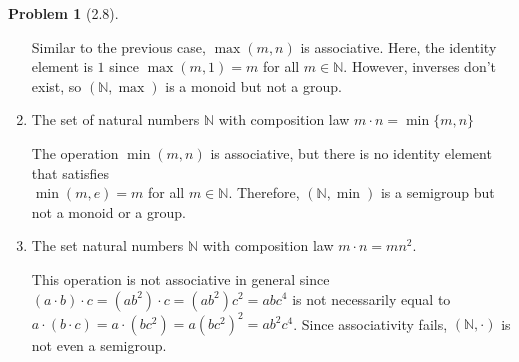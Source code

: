 \documentclass[12pt]{article}
\theoremstyle{definition}
\newtheorem{problem}{Problem}
\begin{document}
\begin{problem}[2.8]
\begin{enumerate}[label=(\alph*)]
        \begin{solution}
            Similar to the previous case, $\max(m, n)$ is associative. Here, the identity element is $1$ since $\max(m, 1) = m$ for all $m \in \mathbb{N}$. However, inverses don't exist, so $(\mathbb{N}, \max)$ is a monoid but not a group.
        \end{solution}
        \item The set of natural numbers $\mathbb{N}$ with composition law $m \cdot n = \min\{m, n\}$
        
        \begin{solution}
            The operation $\min(m, n)$ is associative, but there is no identity element that satisfies \\ $\min(m, e) = m$ for all $m \in \mathbb{N}$. Therefore, $(\mathbb{N}, \min)$ is a semigroup but not a monoid or a group.
        \end{solution}
        \item The set natural numbers $\mathbb{N}$ with composition law $m \cdot n = mn^2$.
        
        \begin{solution}
            This operation is not associative in general since $(a \cdot b) \cdot c = (ab^2) \cdot c = (ab^2)c^2 = abc^4$ is not necessarily equal to $a \cdot (b \cdot c) = a \cdot (bc^2) = a(bc^2)^2 = ab^2c^4$. Since associativity fails, $(\mathbb{N}, \cdot)$ is not even a semigroup.
        \end{solution}
    \end{enumerate}
\end{problem}
\end{document}
